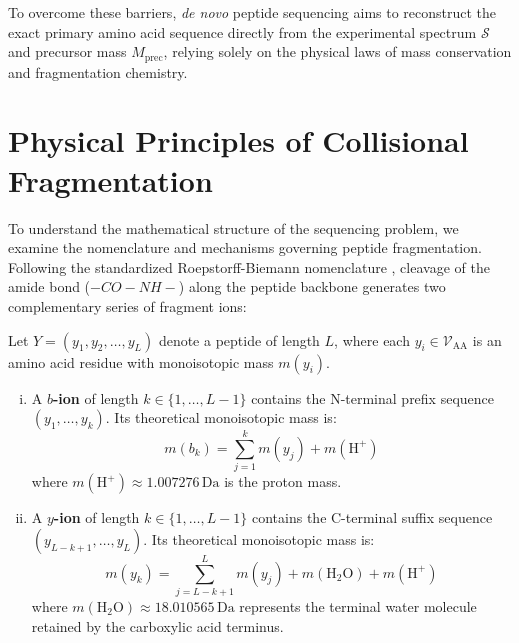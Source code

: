 To overcome these barriers, \emph{de novo} peptide sequencing aims to reconstruct the exact primary amino acid sequence directly from the experimental spectrum $\mathcal{S}$ and precursor mass $M_{\text{prec}}$, relying solely on the physical laws of mass conservation and fragmentation chemistry.

\section{Physical Principles of Collisional Fragmentation}

To understand the mathematical structure of the sequencing problem, we examine the nomenclature and mechanisms governing peptide fragmentation. Following the standardized Roepstorff-Biemann nomenclature \citep{Roepstorff1984, Biemann1988}, cleavage of the amide bond ($-CO-NH-$) along the peptide backbone generates two complementary series of fragment ions:

\begin{defn}
Let $Y = (y_1, y_2, \dots, y_L)$ denote a peptide of length $L$, where each $y_i \in \mathcal{V}_{\text{AA}}$ is an amino acid residue with monoisotopic mass $m(y_i)$. 
\begin{enumerate}[(i)]
\item A \textbf{$b$-ion} of length $k \in \{1, \dots, L-1\}$ contains the N-terminal prefix sequence $(y_1, \dots, y_k)$. Its theoretical monoisotopic mass is:
\begin{equation}
m(b_k) = \sum_{j=1}^k m(y_j) + m(\text{H}^+)
\label{eq:b_ion_mass}
\end{equation}
where $m(\text{H}^+) \approx 1.007276\,\text{Da}$ is the proton mass.
\item A \textbf{$y$-ion} of length $k \in \{1, \dots, L-1\}$ contains the C-terminal suffix sequence $(y_{L-k+1}, \dots, y_L)$. Its theoretical monoisotopic mass is:
\begin{equation}
m(y_k) = \sum_{j=L-k+1}^L m(y_j) + m(\text{H}_2\text{O}) + m(\text{H}^+)
\label{eq:y_ion_mass}
\end{equation}
where $m(\text{H}_2\text{O}) \approx 18.010565\,\text{Da}$ represents the terminal water molecule retained by the carboxylic acid terminus.
\end{enumerate}
\end{defn}

